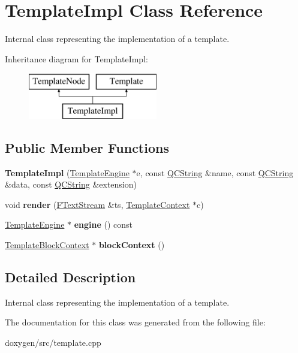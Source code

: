 \hypertarget{class_template_impl}{}\section{Template\+Impl Class Reference}
\label{class_template_impl}


Internal class representing the implementation of a template.  


Inheritance diagram for Template\+Impl\+:\begin{figure}[H]
\begin{center}
\leavevmode
\includegraphics[height=2.000000cm]{class_template_impl}
\end{center}
\end{figure}
\subsection*{Public Member Functions}
\begin{DoxyCompactItemize}
\item 
\mbox{\label{class_template_impl_a31d4c634a18a30d183118f4f69e6f53d}} 
{\bfseries Template\+Impl} (\mbox{\hyperlink{class_template_engine}{Template\+Engine}} $\ast$e, const \mbox{\hyperlink{class_q_c_string}{Q\+C\+String}} \&name, const \mbox{\hyperlink{class_q_c_string}{Q\+C\+String}} \&data, const \mbox{\hyperlink{class_q_c_string}{Q\+C\+String}} \&extension)
\item 
\mbox{\label{class_template_impl_a99ab0382fe9d8d2337647a8c28df70f1}} 
void {\bfseries render} (\mbox{\hyperlink{class_f_text_stream}{F\+Text\+Stream}} \&ts, \mbox{\hyperlink{class_template_context}{Template\+Context}} $\ast$c)
\item 
\mbox{\label{class_template_impl_aa029e31ffb9a13a815b26b0aa42de967}} 
\mbox{\hyperlink{class_template_engine}{Template\+Engine}} $\ast$ {\bfseries engine} () const
\item 
\mbox{\label{class_template_impl_a43eda2b868bc5efc4c55c8ce56d6684b}} 
\mbox{\hyperlink{class_template_block_context}{Template\+Block\+Context}} $\ast$ {\bfseries block\+Context} ()
\end{DoxyCompactItemize}


\subsection{Detailed Description}
Internal class representing the implementation of a template. 

The documentation for this class was generated from the following file\+:\begin{DoxyCompactItemize}
\item 
doxygen/src/template.\+cpp\end{DoxyCompactItemize}
